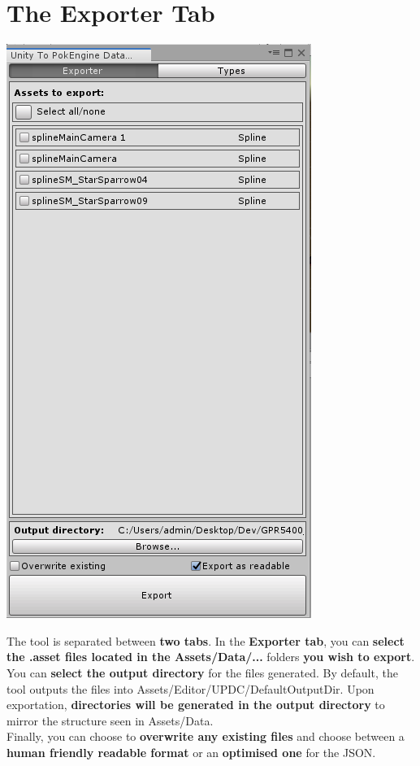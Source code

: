 \documentclass[10pt,a4paper]{article}
\begin{document}
\section{The Exporter Tab}
\begin{center}
\includegraphics[scale=0.70]{UPDC_UI}
\end{center}
The tool is separated between \textbf{two tabs}. In the \textbf{Exporter tab}, you can \textbf{select the .asset files located in the Assets/Data/...} folders \textbf{you wish to export}.\\
You can \textbf{select the output directory} for the files generated. By default, the tool outputs the files into Assets/Editor/UPDC/DefaultOutputDir.
Upon exportation, \textbf{directories will be generated in the output directory} to mirror the structure seen in Assets/Data.\\
Finally, you can choose to \textbf{overwrite any existing files} and choose between a \textbf{human friendly readable format} or an \textbf{optimised one} for the JSON.
\newpage
\end{document}
